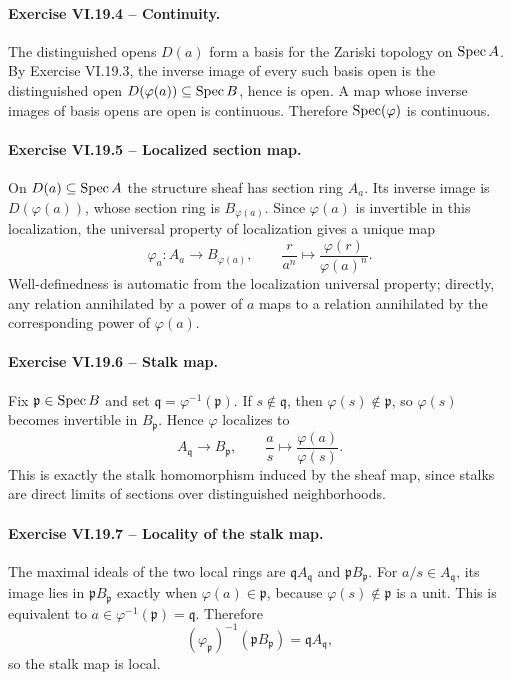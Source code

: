 \paragraph{Exercise VI.19.4 -- Continuity.}
\begin{solution}
The distinguished opens \(D(a)\) form a basis for the Zariski topology on \(\operatorname{Spec} A\).  By Exercise VI.19.3, the inverse image of every such basis open is the distinguished open \(D(\varphi(a))\subseteq\operatorname{Spec} B\), hence is open.  A map whose inverse images of basis opens are open is continuous.  Therefore \(\operatorname{Spec}(\varphi)\) is continuous.
\end{solution}

\paragraph{Exercise VI.19.5 -- Localized section map.}
\begin{solution}
On \(D(a)\subseteq\operatorname{Spec} A\) the structure sheaf has section ring \(A_a\).  Its inverse image is \(D(\varphi(a))\), whose section ring is \(B_{\varphi(a)}\).  Since \(\varphi(a)\) is invertible in this localization, the universal property of localization gives a unique map
\[
\varphi_a:A_a\to B_{\varphi(a)},
\qquad
\frac r{a^n}\longmapsto \frac{\varphi(r)}{\varphi(a)^n}.
\]
Well-definedness is automatic from the localization universal property; directly, any relation annihilated by a power of \(a\) maps to a relation annihilated by the corresponding power of \(\varphi(a)\).
\end{solution}

\paragraph{Exercise VI.19.6 -- Stalk map.}
\begin{solution}
Fix \(\mathfrak p\in\operatorname{Spec} B\) and set \(\mathfrak q=\varphi^{-1}(\mathfrak p)\).  If \(s\notin\mathfrak q\), then \(\varphi(s)\notin\mathfrak p\), so \(\varphi(s)\) becomes invertible in \(B_{\mathfrak p}\).  Hence \(\varphi\) localizes to
\[
A_{\mathfrak q}\longrightarrow B_{\mathfrak p},
\qquad
\frac as\longmapsto\frac{\varphi(a)}{\varphi(s)}.
\]
This is exactly the stalk homomorphism induced by the sheaf map, since stalks are direct limits of sections over distinguished neighborhoods.
\end{solution}

\paragraph{Exercise VI.19.7 -- Locality of the stalk map.}
\begin{solution}
The maximal ideals of the two local rings are \(\mathfrak qA_{\mathfrak q}\) and \(\mathfrak pB_{\mathfrak p}\).  For \(a/s\in A_{\mathfrak q}\), its image lies in \(\mathfrak pB_{\mathfrak p}\) exactly when \(\varphi(a)\in\mathfrak p\), because \(\varphi(s)\notin\mathfrak p\) is a unit.  This is equivalent to \(a\in\varphi^{-1}(\mathfrak p)=\mathfrak q\).  Therefore
\[
(\varphi_{\mathfrak p})^{-1}(\mathfrak pB_{\mathfrak p})
=\mathfrak qA_{\mathfrak q},
\]
so the stalk map is local.
\end{solution}

